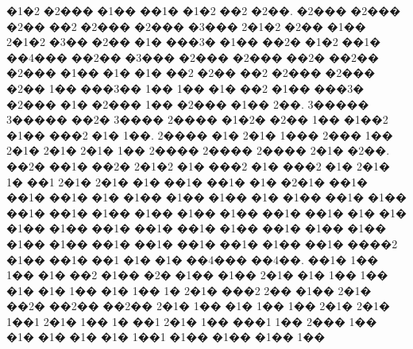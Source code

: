 {�1�2
�2���
�1��
��1�
�1�2
��2
�2��.
�2���
�2���
�2��
��2
�2���
�2���
�3���
2�1�2
�2��
�1��
2�1�2
�3��
�2��
�1�
���3�
�1��
��2�
�1�2
��1�
��4���
��2��
�3���
�2���
�2���
��2�
��2��
�2���
�1��
�1�
�1�
��2
�2��
��2
�2���
�2���
�2��
1��
���3��
1��
1��
�1�
��2
�1��
���3�
�2���
�1�
�2���
1��
�2���
�1��
2��.
3�����
3�����
��2�
3����
2����
�1�2�
�2��
1��
�1��2
�1��
���2
�1�
1��.
2����
�1�
2�1�
1���
2���
1��
2�1�
2�1�
2�1�
1��
2����
2����
2����
2�1�
�2��.
��2�
��1�
��2�
2�1�2
�1�
���2
�1�
���2
�1�
2�1�
1�
��1
2�1�
2�1�
�1�
��1�
��1�
�1�
�2�1�
��1�
��1�
��1�
�1�
�1��
�1��
�1��
�1�
�1��
��1�
�1��
��1�
��1�
�1��
�1��
�1��
�1��
��1�
��1�
�1�
�1�
�1��
�1��
��1�
��1�
��1�
�1��
��1�
�1��
�1��
�1��
�1��
��1�
��1�
��1�
��1�
�1��
��1�
����2
�1��
��1�
��1
�1�
�1�
��4���
��4��.
��1�
1��
1��
�1�
��2
�1��
�2�
�1��
�1��
2�1�
�1�
1��
1��
�1�
�1�
1��
�1�
1��
1�
2�1�
���2
2��
�1��
2�1�
��2�
��2��
��2��
2�1�
1��
�1�
1��
1��
2�1�
2�1�
1��1
2�1�
1��
1�
��1
2�1�
1��
���1
1��
2���
1��
�1�
�1�
�1�
�1�
1��1
�1��
�1��
�1��
1��
}


\endgroup

